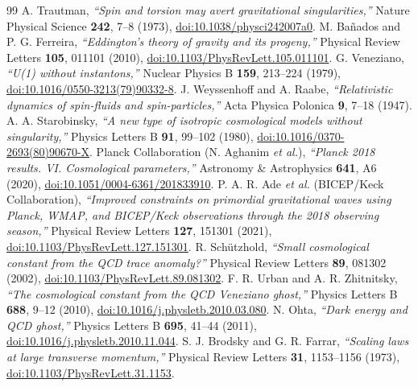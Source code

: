 \documentclass[10pt,aps,prd,twocolumn,superscriptaddress,nofootinbib,floatfix,longbibliography,showkeys]{revtex4-2}
\begin{document}
\begin{thebibliography}{99}
 A. Trautman, \textit{``Spin and torsion may avert gravitational singularities,''} Nature Physical Science \textbf{242}, 7--8 (1973), \href{https://doi.org/10.1038/physci242007a0}{doi:10.1038/physci242007a0}.
 M. Ba\~nados and P. G. Ferreira, \textit{``Eddington's theory of gravity and its progeny,''} Physical Review Letters \textbf{105}, 011101 (2010), \href{https://doi.org/10.1103/PhysRevLett.105.011101}{doi:10.1103/PhysRevLett.105.011101}.
 G. Veneziano, \textit{``U(1) without instantons,''} Nuclear Physics B \textbf{159}, 213--224 (1979), \href{https://doi.org/10.1016/0550-3213(79)90332-8}{doi:10.1016/0550-3213(79)90332-8}.
 J. Weyssenhoff and A. Raabe, \textit{``Relativistic dynamics of spin-fluids and spin-particles,''} Acta Physica Polonica \textbf{9}, 7--18 (1947).
 A. A. Starobinsky, \textit{``A new type of isotropic cosmological models without singularity,''} Physics Letters B \textbf{91}, 99--102 (1980), \href{https://doi.org/10.1016/0370-2693(80)90670-X}{doi:10.1016/0370-2693(80)90670-X}.
 Planck Collaboration (N. Aghanim \textit{et al.}), \textit{``Planck 2018 results. VI. Cosmological parameters,''} Astronomy \& Astrophysics \textbf{641}, A6 (2020), \href{https://doi.org/10.1051/0004-6361/201833910}{doi:10.1051/0004-6361/201833910}.
 P. A. R. Ade \textit{et al.} (BICEP/Keck Collaboration), \textit{``Improved constraints on primordial gravitational waves using Planck, WMAP, and BICEP/Keck observations through the 2018 observing season,''} Physical Review Letters \textbf{127}, 151301 (2021), \href{https://doi.org/10.1103/PhysRevLett.127.151301}{doi:10.1103/PhysRevLett.127.151301}.
 R. Sch\"utzhold, \textit{``Small cosmological constant from the QCD trace anomaly?''} Physical Review Letters \textbf{89}, 081302 (2002), \href{https://doi.org/10.1103/PhysRevLett.89.081302}{doi:10.1103/PhysRevLett.89.081302}.
 F. R. Urban and A. R. Zhitnitsky, \textit{``The cosmological constant from the QCD Veneziano ghost,''} Physics Letters B \textbf{688}, 9--12 (2010), \href{https://doi.org/10.1016/j.physletb.2010.03.080}{doi:10.1016/j.physletb.2010.03.080}.
 N. Ohta, \textit{``Dark energy and QCD ghost,''} Physics Letters B \textbf{695}, 41--44 (2011), \href{https://doi.org/10.1016/j.physletb.2010.11.044}{doi:10.1016/j.physletb.2010.11.044}.
 S. J. Brodsky and G. R. Farrar, \textit{``Scaling laws at large transverse momentum,''} Physical Review Letters \textbf{31}, 1153--1156 (1973), \href{https://doi.org/10.1103/PhysRevLett.31.1153}{doi:10.1103/PhysRevLett.31.1153}.

\end{thebibliography}
\end{document}
